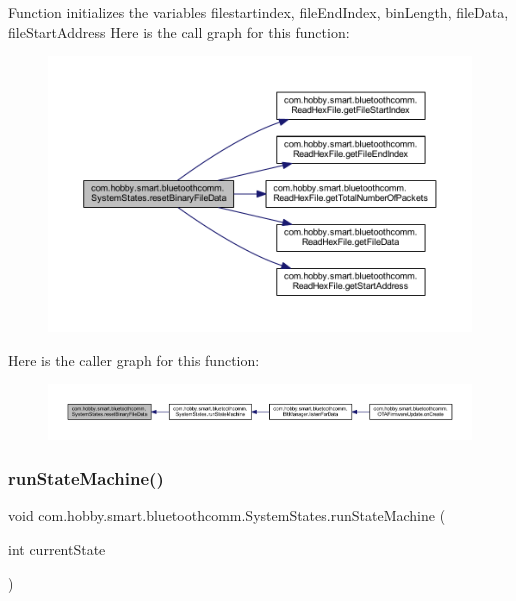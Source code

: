 Function initializes the variables filestartindex, file\+End\+Index, bin\+Length, file\+Data, file\+Start\+Address Here is the call graph for this function\+:\nopagebreak
\begin{figure}[H]
\begin{center}
\leavevmode
\includegraphics[width=350pt]{classcom_1_1hobby_1_1smart_1_1bluetoothcomm_1_1_system_states_a87fb0e57edebde31af07339fcb5f7300_cgraph}
\end{center}
\end{figure}
Here is the caller graph for this function\+:\nopagebreak
\begin{figure}[H]
\begin{center}
\leavevmode
\includegraphics[width=350pt]{classcom_1_1hobby_1_1smart_1_1bluetoothcomm_1_1_system_states_a87fb0e57edebde31af07339fcb5f7300_icgraph}
\end{center}
\end{figure}
\mbox{\label{classcom_1_1hobby_1_1smart_1_1bluetoothcomm_1_1_system_states_a86f180683e8af92cb4b605cbfc5288a5}} 
\subsubsection{\texorpdfstring{run\+State\+Machine()}{runStateMachine()}}
{\footnotesize\ttfamily void com.\+hobby.\+smart.\+bluetoothcomm.\+System\+States.\+run\+State\+Machine (\begin{DoxyParamCaption}\item[{int}]{current\+State }\end{DoxyParamCaption})}

